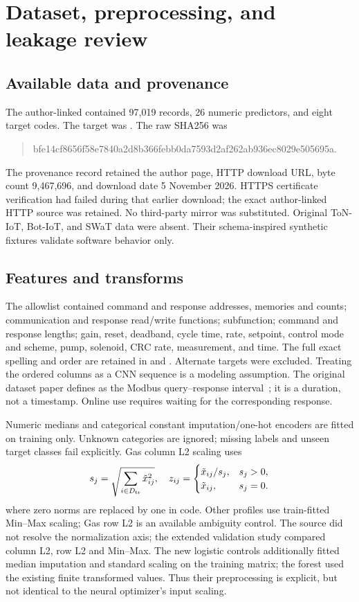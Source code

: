 \documentclass[11pt,a4paper]{report}
\begin{document}
\chapter{Dataset, preprocessing, and leakage review}
\section{Available data and provenance}
The author-linked  contained 97,019 records, 26 numeric predictors, and eight target codes. The target was . The raw SHA256 was
\begin{quote}\small\ttfamily\sloppy bfe14cf8656f58e7840a2d8b366febb0da7593d2af262ab936ec8029e505695a.\end{quote}
The provenance record retained the author page, HTTP download URL, byte count 9,467,696, and download date 5 November 2026. HTTPS certificate verification had failed during that earlier download; the exact author-linked HTTP source was retained. No third-party mirror was substituted. Original ToN-IoT, Bot-IoT, and SWaT data were absent. Their schema-inspired synthetic fixtures validate software behavior only.

\section{Features and transforms}
The allowlist contained command and response addresses, memories and counts; communication and response read/write functions; subfunction; command and response lengths; gain, reset, deadband, cycle time, rate, setpoint, control mode and scheme, pump, solenoid, CRC rate, measurement, and time. The full exact spelling and order are retained in  and . Alternate targets were excluded. Treating the ordered columns as a CNN sequence is a modeling assumption. The original dataset paper defines  as the Modbus query--response interval~\cite{morris2014}; it is a duration, not a timestamp. Online use requires waiting for the corresponding response.

Numeric medians and categorical constant imputation/one-hot encoders are fitted on training only. Unknown categories are ignored; missing labels and unseen target classes fail explicitly. Gas column L2 scaling uses
\begin{equation}s_j=\sqrt{\sum_{i\in D_{\rm tr}}\tilde{x}_{ij}^2},\quad z_{ij}=\begin{cases}\tilde{x}_{ij}/s_j,&s_j>0,\\\tilde{x}_{ij},&s_j=0.\end{cases}\end{equation}
where zero norms are replaced by one in code. Other profiles use train-fitted Min--Max scaling; Gas row L2 is an available ambiguity control. The source did not resolve the normalization axis; the extended validation study compared column L2, row L2 and Min--Max. The new logistic controls additionally fitted median imputation and standard scaling on the training matrix; the forest used the existing finite transformed values. Thus their preprocessing is explicit, but not identical to the neural optimizer's input scaling.
\end{document}
